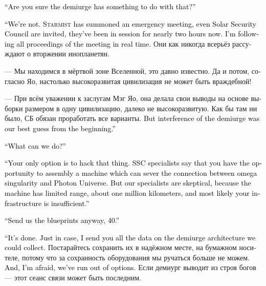 \documentclass[a4paper,12pt,fleqn]{book}\usepackage{cooltooltips}\usepackage{polyglossia}\setdefaultlanguage[babelshorthands=true]{russian}\setotherlanguage{english}\defaultfontfeatures{Ligatures=TeX,Mapping=tex-text} \usepackage{xcolor}\definecolor{lightgray}{HTML}{bbbbbb}\color{lightgray}\newcommand{\ml}[3]{\textenglish{\textcolor{black}{#3}}}
\begin{document}
\ml{$0$}
{--- Вы уверены, что это проделки демиурга?}
{``Are you sure the demiurge has something to do with that?''}

\ml{$0$}
{--- Сложно сказать.}
{``We're not.}
\ml{$0$}
{<<Стармист>> собрал срочный консилиум, подключили Совет Безопасности Солнечной системы, они заседают уже два часа.}
{\textsc{Starmist} has summoned an emergency meeting, even Solar Security Council are invited, they've been in session for nearly two hours now.}
\ml{$0$}
{Я слежу за ходом совещания в реальном времени.}
{I'm following all proceedings of the meeting in real time.}
Они как никогда всерьёз рассуждают о вторжении инопланетян.

--- Мы находимся в мёртвой зоне Вселенной, это давно известно.
Да и потом, согласно Яо, настолько высокоразвитая цивилизация не может быть враждебной!

--- При всём уважении к заслугам Мэг Яо, она делала свои выводы на основе выборки размером в одну цивилизацию, далеко не высокоразвитую.
Как бы там ни было, СБ обязан проработать все варианты.
\ml{$0$}
{Однако версия с демиургом была основной с самого начала.}
{But interference of the demiurge was our best guess from the beginning.''}

\ml{$0$}
{--- Мы можем что-то сделать?}
{``What can we do?''}

\ml{$0$}
{--- Только прямой взлом.}
{``Your only option is to hack that thing.}
\ml{$0$}
{Специалисты СБ утверждают, что ещё есть возможность собрать установку для принудительного отсоединения омега-сингулярности от мира Фотона.}
{SSC specialists say that you have the opportunity to assembly a machine which can sever the connection between omega singularity and Photon Universe.}
\ml{$0$}
{Но наши специалисты относятся к этому скептически --- установка действует на ограниченном расстоянии, порядка миллиона километров, и у вас скорее всего не хватит инфраструктуры.}
{But our specialists are skeptical, because the machine has limited range, about one million kilometers, and most likely your infrastructure is insufficient.''}

\ml{$0$}
{--- Всё равно пришлите нам схемы, 40.}
{``Send us the blueprints anyway, 40.''}

\ml{$0$}
{--- Сделано.}
{``It's done.}
\ml{$0$}
{На всякий случай я дополнительно переслал вам все данные по архитектуре демиурга, которые нам удалось собрать.}
{Just in case, I send you all the data on the demiurge architecture we could collect.}
Постарайтесь сохранить их в надёжном месте, на бумажном носителе, потому что за сохранность оборудования мы ручаться больше не можем.
\ml{$0$}
{Больше, увы, сделать ничего нельзя.}
{And, I'm afraid, we've run out of options.}
Если демиург выводит из строя богов --- этот сеанс связи может быть последним.
\end{document}
